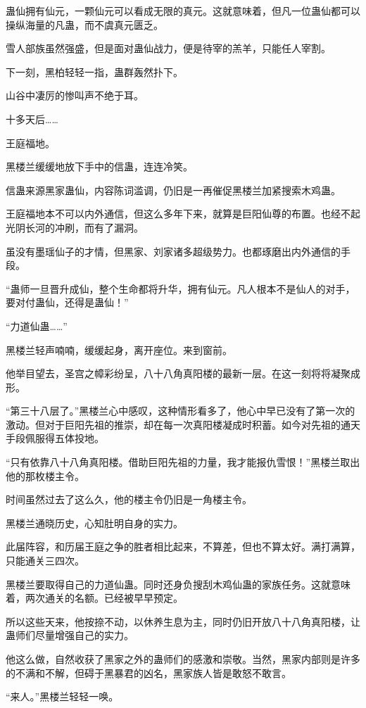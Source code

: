 \begin{this_body}
蛊仙拥有仙元，一颗仙元可以看成无限的真元。这就意味着，但凡一位蛊仙都可以操纵海量的凡蛊，而不虞真元匮乏。

雪人部族虽然强盛，但是面对蛊仙战力，便是待宰的羔羊，只能任人宰割。

下一刻，黑柏轻轻一指，蛊群轰然扑下。

山谷中凄厉的惨叫声不绝于耳。

十多天后……

王庭福地。

黑楼兰缓缓地放下手中的信蛊，连连冷笑。

信蛊来源黑家蛊仙，内容陈词滥调，仍旧是一再催促黑楼兰加紧搜索木鸡蛊。

王庭福地本不可以内外通信，但这么多年下来，就算是巨阳仙尊的布置。也经不起光阴长河的冲刷，而有了漏洞。

虽没有墨瑶仙子的才情，但黑家、刘家诸多超级势力。也都琢磨出内外通信的手段。

“蛊师一旦晋升成仙，整个生命都将升华，拥有仙元。凡人根本不是仙人的对手，要对付蛊仙，还得是蛊仙！”

“力道仙蛊……”

黑楼兰轻声喃喃，缓缓起身，离开座位。来到窗前。

他举目望去，圣宫之幛彩纷呈，八十八角真阳楼的最新一层。在这一刻将将凝聚成形。

“第三十八层了。”黑楼兰心中感叹，这种情形看多了，他心中早已没有了第一次的激动。但对于巨阳先祖的推崇，却在每一次真阳楼凝成时积蓄。如今对先祖的通天手段佩服得五体投地。

“只有依靠八十八角真阳楼。借助巨阳先祖的力量，我才能报仇雪恨！”黑楼兰取出他的那枚楼主令。

时间虽然过去了这么久，他的楼主令仍旧是一角楼主令。

黑楼兰通晓历史，心知肚明自身的实力。

此届阵容，和历届王庭之争的胜者相比起来，不算差，但也不算太好。满打满算，只能通关三四次。

黑楼兰要取得自己的力道仙蛊。同时还身负搜刮木鸡仙蛊的家族任务。这就意味着，两次通关的名额。已经被早早预定。

所以这些天来，他按捺不动，以休养生息为主，同时仍旧开放八十八角真阳楼，让蛊师们尽量增强自己的实力。

他这么做，自然收获了黑家之外的蛊师们的感激和崇敬。当然，黑家内部则是许多的不满和不解，但碍于黑暴君的凶名，黑家族人皆是敢怒不敢言。

“来人。”黑楼兰轻轻一唤。


\end{this_body}
